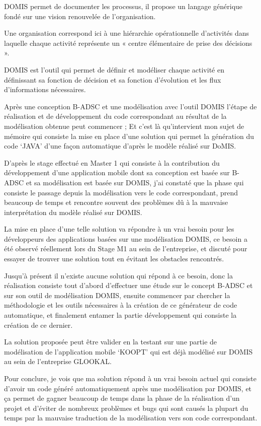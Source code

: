 DOMIS permet de documenter les processus, il propose un langage générique fondé sur une vision renouvelée de l’organisation.\cite{domis}

Une organisation correspond ici à une hiérarchie opérationnelle d’activités dans laquelle chaque activité représente un « centre élémentaire de prise des décisions ».

DOMIS est l’outil qui permet de définir et modéliser chaque activité en définissant sa fonction de décision et sa fonction d’évolution et les flux d’informations nécessaires.

\vspace{0,5cm}

Après une conception B-ADSC et une modélisation avec l’outil DOMIS l’étape de réalisation et de développement du code correspondant au résultat de la modélisation obtenue peut commencer ; Et c’est là qu’intervient mon sujet de mémoire qui consiste la mise en place d’une solution qui permet la génération du code ‘JAVA’ d’une façon automatique d’après le modèle réalisé sur DoMIS.

\vspace{0,5cm}

D’après le stage effectué en Master 1 qui consiste à la contribution du développement d’une application mobile dont sa conception est basée sur B-ADSC et sa modélisation est basée sur DOMIS, j’ai constaté que la phase qui consiste le passage depuis la modélisation vers le code correspondant, prend beaucoup de temps et rencontre souvent des problèmes dû à la mauvaise interprétation du modèle réalisé sur DOMIS.

La mise en place d’une telle solution va répondre à un vrai besoin pour les développeurs des applications basées sur une modélisation DOMIS, ce besoin a été observé réellement lors du Stage M1 au sein de l’entreprise, et discuté pour essayer de trouver une solution tout en évitant les obstacles rencontrés.

\vspace{0,5cm}

Jusqu’à présent il n’existe aucune solution qui répond à ce besoin, donc la réalisation consiste tout d’abord d'effectuer une étude sur le concept B-ADSC et sur son outil de modélisation DOMIS, ensuite commencer par chercher la méthodologie et les outils nécessaires à la création de ce générateur de code automatique, et finalement entamer la partie développement qui consiste la création de ce dernier.

La solution proposée peut être valider en la testant sur une partie de modélisation de l’application mobile ‘KOOPT’ qui est déjà modélisé sur DOMIS au sein de l’entreprise GLOOKAL.

\vspace{0,5cm}

Pour conclure, je vois que ma solution répond à un vrai besoin actuel qui consiste d’avoir un code généré automatiquement après une modélisation par DOMIS, et ça permet de gagner beaucoup de temps dans la phase de la réalisation d’un projet et d’éviter de nombreux problèmes et bugs qui sont causés la plupart du temps par la mauvaise traduction de la modélisation vers son code correspondant.
